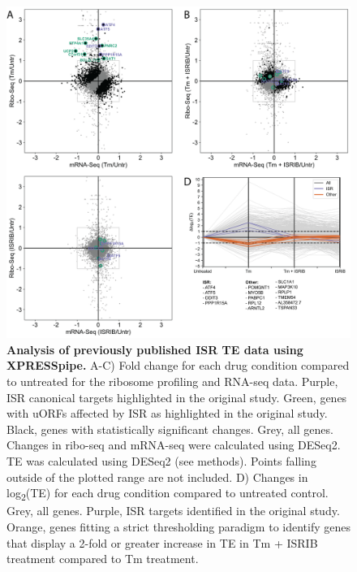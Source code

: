 \documentclass[10pt, oneside]{article}
\begin{document}
\begin{figure}
\centering
  \includegraphics[width=180mm]{figures/xpresspipe_figure3.png}
  \caption{\textbf{Analysis of previously published ISR TE data using XPRESSpipe.} A-C) Fold change for each drug condition compared to untreated for the ribosome profiling and RNA-seq data. Purple, ISR canonical targets highlighted in the original study. Green, genes with uORFs affected by ISR as highlighted in the original study. Black, genes with statistically significant changes. Grey, all genes. Changes in ribo-seq and mRNA-seq were calculated using DESeq2. TE was calculated using DESeq2 (see methods). Points falling outside of the plotted range are not included. D) Changes in log\textsubscript{2}(TE) for each drug condition compared to untreated control. Grey, all genes. Purple, ISR targets identified in the original study. Orange, genes fitting a strict thresholding paradigm to identify genes that display a 2-fold or greater increase in TE in Tm + ISRIB treatment compared to Tm treatment.}
  \label{fig:figure3}
\end{figure}
\end{document}
